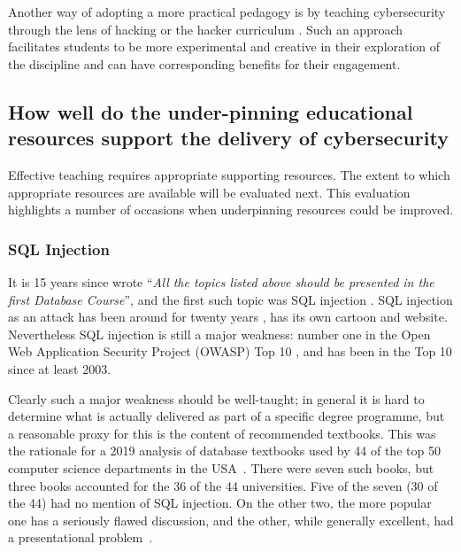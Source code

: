 \documentclass[sigconf]{acmart}
\begin{document}
Another way of adopting a more practical pedagogy is by teaching cybersecurity through the lens of hacking or the hacker curriculum \cite{bratus2010teaching}. Such an approach facilitates students to be more experimental and creative in their exploration of the discipline and can have corresponding benefits for their engagement. 

\begin{comment}


It is an interesting question as to whether standards such as PCI DSS should be addressed within degree courses (clearly degree courses can never cover all standards) or whether they should be addressed in professional training courses. However, the current situation is not ideal from the perspective of industry (or users of systems). The inclusion of key standards could be seen as a valuable enhancement activity to how cybersecurity it taught.

\end{comment}

\subsection{How well do the under-pinning educational resources support the delivery of cybersecurity}
Effective teaching requires appropriate supporting resources. The extent to which appropriate resources are available will be evaluated next. This evaluation highlights a number of occasions when underpinning resources could be improved.

\subsubsection{SQL Injection}
It is 15 years since \cite{Guimaraesetal2004} wrote ``{\emph{All the topics listed above should be presented in the first Database Course}}'', and the first such topic was SQL injection \cite{SPIDynamics2002,Anonymous2018b}. SQL injection as an attack has been around for twenty years \cite{HornerHyslip2017a}, has its own cartoon and website. Nevertheless SQL injection is still a major weakness: number one in the Open Web Application Security Project (OWASP) Top 10 \cite{OWASP2017a}, and has been in the Top 10 since at least 2003. 


Clearly such a major weakness should be well-taught; in general it is hard to determine what is actually delivered as part of a specific degree programme, but a reasonable proxy for this is the content of recommended textbooks. This was the rationale for a 2019 analysis of database textbooks used by 44 of the top 50 computer science departments in the USA~\cite{Drop2019}.  There were seven such books, but three books accounted for the 36 of the 44 universities. Five of the seven (30 of the 44) had no mention of SQL injection. On the other two, the more popular one has a seriously flawed discussion, and the other, while generally excellent, had a presentational problem~\cite{Drop2019}.
\end{document}
